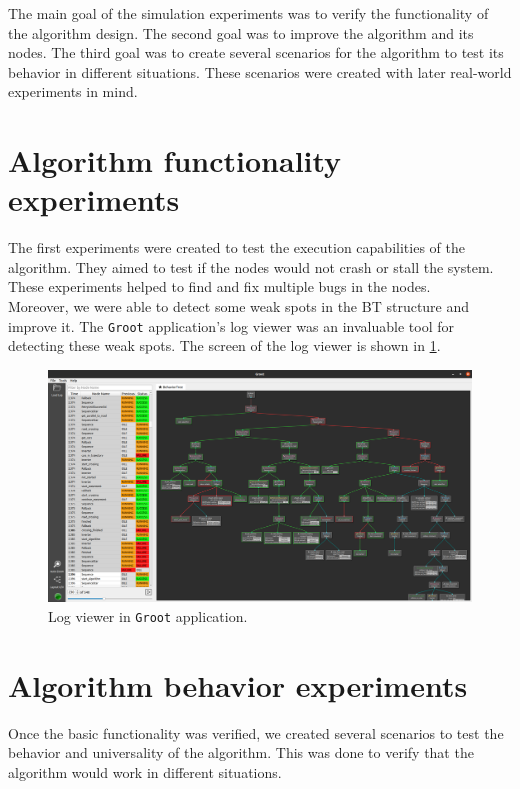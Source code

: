 The main goal of the simulation experiments was to verify the functionality of the algorithm design. The second goal was to improve the algorithm and its nodes. The third goal was to create several scenarios for the algorithm to test its behavior in different situations. These scenarios were created with later real-world experiments in mind.\\

\section{Algorithm functionality experiments}
    The first experiments were created to test the execution capabilities of the algorithm. They aimed to test if the nodes would not crash or stall the system. These experiments helped to find and fix multiple bugs in the nodes.\\
    Moreover, we were able to detect some weak spots in the BT structure and improve it. The \texttt{Groot} application's log viewer was an invaluable tool for detecting these weak spots. The screen of the log viewer is shown in \ref{fig:log_viewer}.\\
    \begin{figure}[ht]
        \centering
        \includegraphics[width=\linewidth]{images/log_viewer.png}
        \caption{Log viewer in \texttt{Groot} application.}
        \label{fig:log_viewer}
    \end{figure}

\section{Algorithm behavior experiments}
    Once the basic functionality was verified, we created several scenarios to test the behavior and universality of the algorithm. This was done to verify that the algorithm would work in different situations.\\
